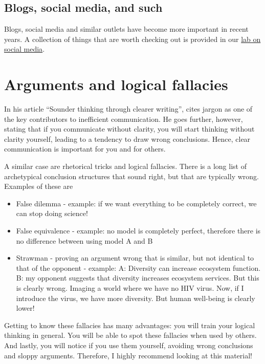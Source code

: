 \documentclass{tufte-book}
\begin{document}
\subsection{Blogs, social media, and such}

Blogs, social media and similar outlets have become more important in recent years. A collection of things that are worth checking out is provided in our \href{https://github.com/florianhartig/ResearchSkills/tree/master/Labs/SocialMedia}{lab on social media}.


\section{Arguments and logical fallacies}

In his article ``Sounder thinking through clearer writing'', \citet{Woodford-Sounderthinkingthrough-1967} cites jargon as one of the key contributors to inefficient communication. He goes further, however, stating that if you communicate without clarity, you will start thinking without clarity yourself, leading to a tendency to draw wrong conclusions. Hence, clear communication is important for you and for others.


A similar case are rhetorical tricks and logical fallacies. There is a long list of archetypical conclusion structures that sound right, but that are typically wrong. Examples of these are

\begin{itemize}
\item False dilemma - example: if we want everything to be completely correct, we can stop doing science!
\item False equivalence - example: no model is completely perfect, therefore there is no difference between using model A and B
\item Strawman - proving an argument wrong that is similar, but not identical to that of the opponent -  example: A: Diversity can increase ecosystem function. B: my opponent suggests that diversity increases ecosystem services. But this is clearly wrong. Imaging a world where we have no HIV virus. Now, if I introduce the virus, we have more diversity. But human well-being is clearly lower!
\end{itemize}

Getting to know these fallacies has many advantages: you will train your logical thinking in general. You will be able to spot these fallacies when used by others. And lastly, you will notice if you use them yourself, avoiding wrong conclusions and sloppy arguments. Therefore, I highly recommend looking at this material!
\end{document}
